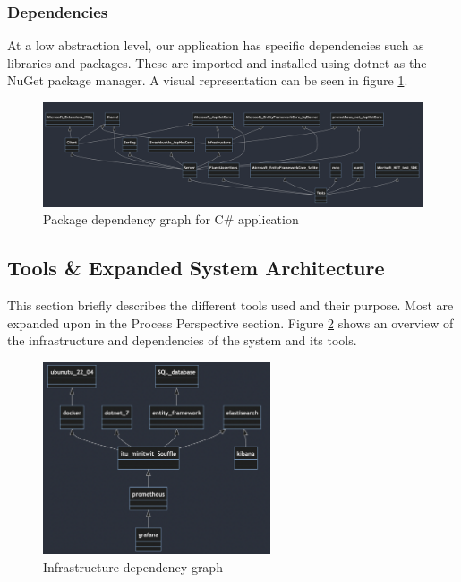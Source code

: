 \subsubsection{Dependencies}
At a low abstraction level, our application has specific dependencies such as libraries and packages. These are imported and installed using dotnet as the NuGet package manager. A visual representation can be seen in figure \ref{fig:packageDependencyGraph}. 

\begin{figure}[H]
    \centering
    \includegraphics[width = \textwidth]{Images/dependencies2.png}
    \caption{Package dependency graph for C\# application}
    \label{fig:packageDependencyGraph}
    \centering
\end{figure}

\subsection{Tools \& Expanded System Architecture}

This section briefly describes the different tools used and their purpose. Most are expanded upon in the Process Perspective section. Figure \ref{fig:infrastructureDependencyGrapg} shows an overview of the infrastructure and dependencies of the system and its tools. 

\begin{figure}[H]
    \centering
    \includegraphics[width = 0.6\textwidth]{Images/application_dependencies.png}
    \caption{Infrastructure dependency graph}
    \label{fig:infrastructureDependencyGrapg}
    \centering
\end{figure}


